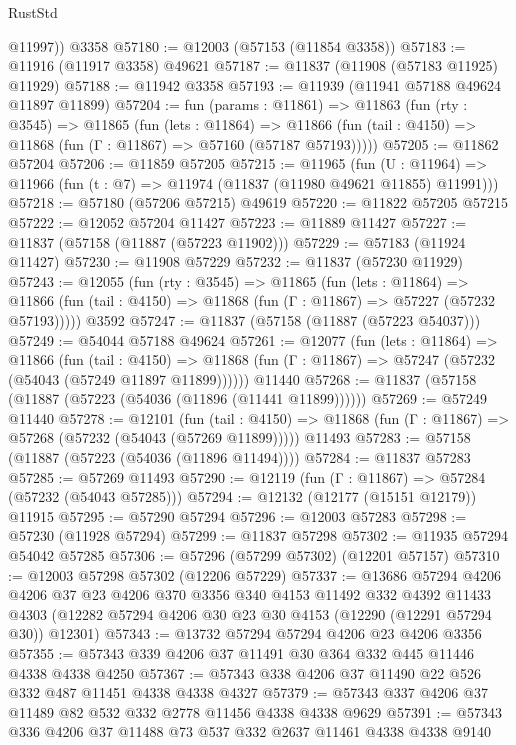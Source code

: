 \begin{lexlean}{RustStd}
\begin{coremodule}
{\begin{coremodule}
{{{{{{{{{{{{{{{{{{{{{{{{{{{{{{{{{{{{{{{{{{{{{{{{{{        @11997))
    @3358
@57180 := @12003 (@57153 (@11854 @3358))
@57183 := @11916 (@11917 @3358) @49621
@57187 := @11837 (@11908 (@57183 @11925) @11929)
@57188 := @11942 @3358
@57193 := @11939 (@11941 @57188 @49624 @11897 @11899)
@57204 := fun (params : @11861) =>
  @11863
    (fun (rty : @3545) =>
    @11865
      (fun (lets : @11864) =>
      @11866 (fun (tail : @4150) => @11868 (fun (Γ : @11867) => @57160 (@57187 @57193)))))
@57205 := @11862 @57204
@57206 := @11859 @57205
@57215 := @11965
    (fun (U : @11964) => @11966 (fun (t : @7) => @11974 (@11837 (@11980 @49621 @11855) @11991)))
@57218 := @57180 (@57206 @57215) @49619
@57220 := @11822 @57205 @57215
@57222 := @12052 @57204 @11427
@57223 := @11889 @11427
@57227 := @11837 (@57158 (@11887 (@57223 @11902)))
@57229 := @57183 (@11924 @11427)
@57230 := @11908 @57229
@57232 := @11837 (@57230 @11929)
@57243 := @12055
    (fun (rty : @3545) =>
    @11865
      (fun (lets : @11864) =>
      @11866 (fun (tail : @4150) => @11868 (fun (Γ : @11867) => @57227 (@57232 @57193)))))
    @3592
@57247 := @11837 (@57158 (@11887 (@57223 @54037)))
@57249 := @54044 @57188 @49624
@57261 := @12077
    (fun (lets : @11864) =>
    @11866
      (fun (tail : @4150) =>
      @11868 (fun (Γ : @11867) => @57247 (@57232 (@54043 (@57249 @11897 @11899))))))
    @11440
@57268 := @11837 (@57158 (@11887 (@57223 (@54036 (@11896 (@11441 @11899))))))
@57269 := @57249 @11440
@57278 := @12101
    (fun (tail : @4150) => @11868 (fun (Γ : @11867) => @57268 (@57232 (@54043 (@57269 @11899)))))
    @11493
@57283 := @57158 (@11887 (@57223 (@54036 (@11896 @11494))))
@57284 := @11837 @57283
@57285 := @57269 @11493
@57290 := @12119 (fun (Γ : @11867) => @57284 (@57232 (@54043 @57285)))
@57294 := @12132 (@12177 (@15151 @12179)) @11915
@57295 := @57290 @57294
@57296 := @12003 @57283
@57298 := @57230 (@11928 @57294)
@57299 := @11837 @57298
@57302 := @11935 @57294 @54042 @57285
@57306 := @57296 (@57299 @57302) (@12201 @57157)
@57310 := @12003 @57298 @57302 (@12206 @57229)
@57337 := @13686
    @57294
    @4206
    @4206
    @37
    @23
    @4206
    @370
    @3356
    @340
    @4153
    @11492
    @332
    @4392
    @11433
    @4303
    (@12282 @57294 @4206 @30 @23 @30 @4153 (@12290 (@12291 @57294 @30)) @12301)
@57343 := @13732 @57294 @57294 @4206 @23 @4206 @3356
@57355 := @57343 @339 @4206 @37 @11491 @30 @364 @332 @445 @11446 @4338 @4338 @4250
@57367 := @57343 @338 @4206 @37 @11490 @22 @526 @332 @487 @11451 @4338 @4338 @4327
@57379 := @57343 @337 @4206 @37 @11489 @82 @532 @332 @2778 @11456 @4338 @4338 @9629
@57391 := @57343 @336 @4206 @37 @11488 @73 @537 @332 @2637 @11461 @4338 @4338 @9140
}}}}}}}}}}}}}}}}}}}}}}}}}}}}}}}}}}}}}}}}}}}}}}}}}}
\end{coremodule}}
\end{coremodule}
\end{lexlean}
